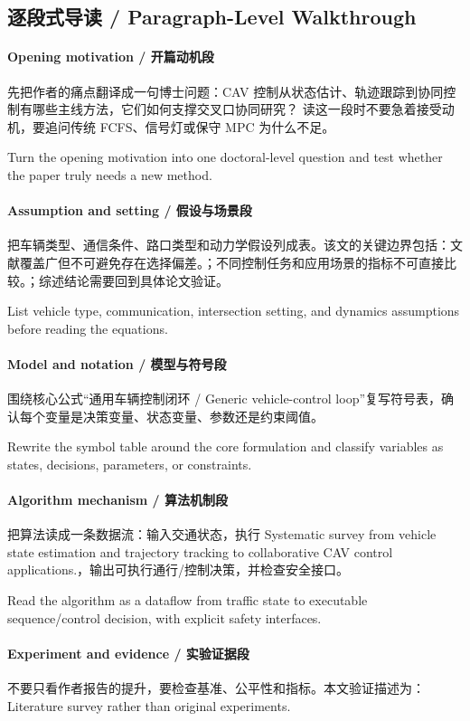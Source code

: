 \documentclass[UTF8,a4paper,11pt,fontset=fandol]{ctexart}
\begin{document}
\subsection{逐段式导读 / Paragraph-Level Walkthrough}
\paragraph{Opening motivation / 开篇动机段}先把作者的痛点翻译成一句博士问题：CAV 控制从状态估计、轨迹跟踪到协同控制有哪些主线方法，它们如何支撑交叉口协同研究？ 读这一段时不要急着接受动机，要追问传统 FCFS、信号灯或保守 MPC 为什么不足。

Turn the opening motivation into one doctoral-level question and test whether the paper truly needs a new method.

\paragraph{Assumption and setting / 假设与场景段}把车辆类型、通信条件、路口类型和动力学假设列成表。该文的关键边界包括：文献覆盖广但不可避免存在选择偏差。；不同控制任务和应用场景的指标不可直接比较。；综述结论需要回到具体论文验证。

List vehicle type, communication, intersection setting, and dynamics assumptions before reading the equations.

\paragraph{Model and notation / 模型与符号段}围绕核心公式“通用车辆控制闭环 / Generic vehicle-control loop”复写符号表，确认每个变量是决策变量、状态变量、参数还是约束阈值。

Rewrite the symbol table around the core formulation and classify variables as states, decisions, parameters, or constraints.

\paragraph{Algorithm mechanism / 算法机制段}把算法读成一条数据流：输入交通状态，执行 Systematic survey from vehicle state estimation and trajectory tracking to collaborative CAV control applications.，输出可执行通行/控制决策，并检查安全接口。

Read the algorithm as a dataflow from traffic state to executable sequence/control decision, with explicit safety interfaces.

\paragraph{Experiment and evidence / 实验证据段}不要只看作者报告的提升，要检查基准、公平性和指标。本文验证描述为：Literature survey rather than original experiments.
\end{document}
